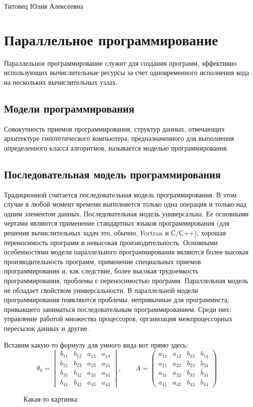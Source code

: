 \documentclass{article}
\author{Титовец}
\begin{document}
Титовец Юлия Алексеевна
\section{Параллельное программирование}
Параллельное программирование служит для создания программ, эффективно использующих вычислительные ресурсы за счет одновременного исполнения кода на нескольких вычислительных узлах.
\subsection{Модели программирования}
Совокупность приемов программирования, структур данных, отвечающих архитектуре гипотетического компьютера, предназначенного для выполнения определенного класса алгоритмов, называется моделью программирования.
\subsection{Последовательная модель программирования}
Традиционной считается последовательная модель программирования. В этом случае в любой момент времени выполняется только одна операция и только над одним элементом данных. Последовательная модель универсальна. Ее основными чертами являются применение стандартных языков программирования (для решения вычислительных задач это, обычно, Fortran и С/С++), хорошая переносимость программ и невысокая производительность. 
Основными особенностями модели параллельного программирования являются более высокая производительность программ, применение специальных приемов программирования и, как следствие, более высокая трудоемкость программирования, проблемы с переносимостью программ. Параллельная модель не обладает свойством универсальности. В параллельной модели программирования появляются проблемы, непривычные для программиста, привыкшего заниматься последовательным программированием. Среди них: управление работой множества процессоров, организация межпроцессорных пересылок данных и другие.
\newpage

Вставим какую-то формулу для умного вида вот прямо здесь:
\linebreak
\begin{equation}\label{eq1}
	\theta_0 =
	\begin{vmatrix}
		b_{11} &b_{12} &a_{13} &a_{14}\\
		b_{21} &b_{22} &a_{23} &a_{24}\\
		b_{31} &b_{32} &a_{33} &a_{34}\\
		b_{41} &b_{42} &a_{43} &a_{44}
	\end{vmatrix},\qquad
	A=
	\begin{pmatrix}
		a_{11} &a_{12} &b_{13} &b_{14}\\
		a_{21} &a_{22} &b_{23} &b_{24}\\
		a_{31} &a_{32} &b_{33} &b_{34}\\
		a_{41} &a_{42} &b_{43} &b_{44}
	\end{pmatrix}
\end{equation}

\begin{figure}
	\caption{Какая-то картинка}
	\label{fig:image}
\end{figure}
\newpage
\tableofcontents
\end{document}
